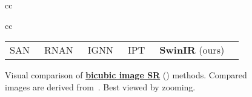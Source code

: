 \documentclass[10pt,twocolumn,letterpaper]{article}
\newlength \g
\begin{document}
\begin{figure*}[!htbp]
{\begin{tabular}{cc}
\begin{tabular}{cc}
\begin{adjustbox}{valign=t}
\begin{tabular}{cccccc}
						SAN~\cite{dai2019SAN} \hspace{\g} &
						RNAN~\cite{zhang2019RNAN}  \hspace{\g} &
						IGNN~\cite{zhou2020IGNN} \hspace{\g} &
						IPT~\cite{chen2021IPT}
						& \textbf{SwinIR} (ours)
						\\
					\end{tabular}
				\end{adjustbox}
			\end{tabular}
			
		\end{tabular}
	}\vspace{-2mm}
	\caption{Visual comparison of \textbf{\underline{bicubic image SR}} () methods. Compared images are derived from~\cite{chen2021IPT}. Best viewed by zooming.}
	\label{fig:sr_visual}
\end{figure*}
\end{document}
